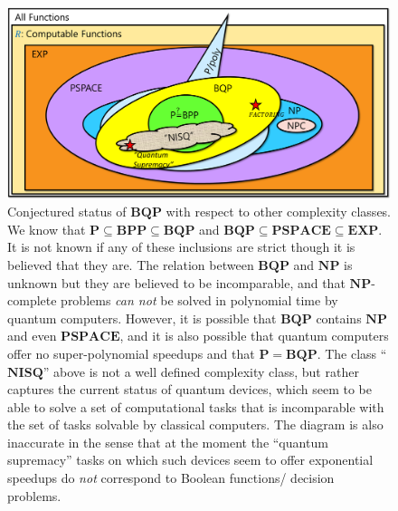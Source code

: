 \begin{figure}
\centering
\includegraphics[width=\textwidth, height=0.25\paperheight, keepaspectratio]{../figure/quantumscenarios.png}
\caption{Conjectured status of \(\mathbf{BQP}\) with respect to other
complexity classes. We know that
\(\mathbf{P} \subseteq \mathbf{BPP} \subseteq \mathbf{BQP}\) and
\(\mathbf{BQP} \subseteq \mathbf{PSPACE} \subseteq \mathbf{EXP}\). It is
not known if any of these inclusions are strict though it is believed
that they are. The relation between \(\mathbf{BQP}\) and \(\mathbf{NP}\)
is unknown but they are believed to be incomparable, and that
\(\mathbf{NP}\)-complete problems \emph{can not} be solved in polynomial
time by quantum computers. However, it is possible that \(\mathbf{BQP}\)
contains \(\mathbf{NP}\) and even \(\mathbf{PSPACE}\), and it is also
possible that quantum computers offer no super-polynomial speedups and
that \(\mathbf{P}=\mathbf{BQP}\). The class ``\(\mathbf{NISQ}\)'' above
is not a well defined complexity class, but rather captures the current
status of quantum devices, which seem to be able to solve a set of
computational tasks that is incomparable with the set of tasks solvable
by classical computers. The diagram is also inaccurate in the sense that
at the moment the ``quantum supremacy'' tasks on which such devices seem
to offer exponential speedups do \emph{not} correspond to Boolean
functions/ decision problems.}
\label{quantumoptionsfig}
\end{figure}

